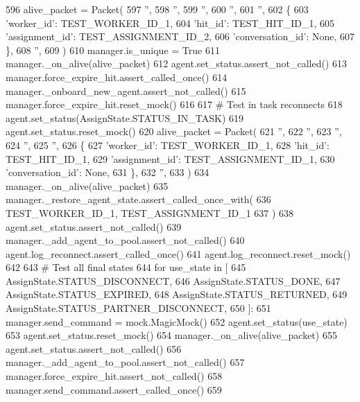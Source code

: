 \begin{DoxyCode}
596         alive\_packet = Packet(
597             \textcolor{stringliteral}{''},
598             \textcolor{stringliteral}{''},
599             \textcolor{stringliteral}{''},
600             \textcolor{stringliteral}{''},
601             \textcolor{stringliteral}{''},
602             \{
603                 \textcolor{stringliteral}{'worker\_id'}: TEST\_WORKER\_ID\_1,
604                 \textcolor{stringliteral}{'hit\_id'}: TEST\_HIT\_ID\_1,
605                 \textcolor{stringliteral}{'assignment\_id'}: TEST\_ASSIGNMENT\_ID\_2,
606                 \textcolor{stringliteral}{'conversation\_id'}: \textcolor{keywordtype}{None},
607             \},
608             \textcolor{stringliteral}{''},
609         )
610         manager.is\_unique = \textcolor{keyword}{True}
611         manager.\_on\_alive(alive\_packet)
612         agent.set\_status.assert\_not\_called()
613         manager.force\_expire\_hit.assert\_called\_once()
614         manager.\_onboard\_new\_agent.assert\_not\_called()
615         manager.force\_expire\_hit.reset\_mock()
616 
617         \textcolor{comment}{# Test in task reconnects}
618         agent.set\_status(AssignState.STATUS\_IN\_TASK)
619         agent.set\_status.reset\_mock()
620         alive\_packet = Packet(
621             \textcolor{stringliteral}{''},
622             \textcolor{stringliteral}{''},
623             \textcolor{stringliteral}{''},
624             \textcolor{stringliteral}{''},
625             \textcolor{stringliteral}{''},
626             \{
627                 \textcolor{stringliteral}{'worker\_id'}: TEST\_WORKER\_ID\_1,
628                 \textcolor{stringliteral}{'hit\_id'}: TEST\_HIT\_ID\_1,
629                 \textcolor{stringliteral}{'assignment\_id'}: TEST\_ASSIGNMENT\_ID\_1,
630                 \textcolor{stringliteral}{'conversation\_id'}: \textcolor{keywordtype}{None},
631             \},
632             \textcolor{stringliteral}{''},
633         )
634         manager.\_on\_alive(alive\_packet)
635         manager.\_restore\_agent\_state.assert\_called\_once\_with(
636             TEST\_WORKER\_ID\_1, TEST\_ASSIGNMENT\_ID\_1
637         )
638         agent.set\_status.assert\_not\_called()
639         manager.\_add\_agent\_to\_pool.assert\_not\_called()
640         agent.log\_reconnect.assert\_called\_once()
641         agent.log\_reconnect.reset\_mock()
642 
643         \textcolor{comment}{# Test all final states}
644         \textcolor{keywordflow}{for} use\_state \textcolor{keywordflow}{in} [
645             AssignState.STATUS\_DISCONNECT,
646             AssignState.STATUS\_DONE,
647             AssignState.STATUS\_EXPIRED,
648             AssignState.STATUS\_RETURNED,
649             AssignState.STATUS\_PARTNER\_DISCONNECT,
650         ]:
651             manager.send\_command = mock.MagicMock()
652             agent.set\_status(use\_state)
653             agent.set\_status.reset\_mock()
654             manager.\_on\_alive(alive\_packet)
655             agent.set\_status.assert\_not\_called()
656             manager.\_add\_agent\_to\_pool.assert\_not\_called()
657             manager.force\_expire\_hit.assert\_not\_called()
658             manager.send\_command.assert\_called\_once()
659 
\end{DoxyCode}
